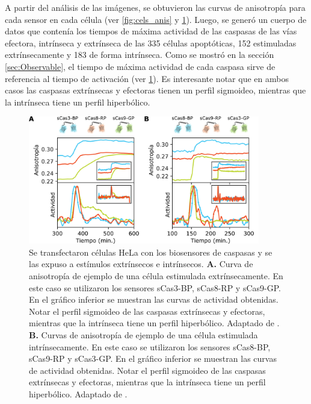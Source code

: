 A partir del análisis de las imágenes, se obtuvieron las curvas de anisotropía para cada sensor en cada célula (ver \cref{fig:cels_anis} y \cref{fig:curvas_experimentales}). Luego, se generó un cuerpo de datos que contenía los tiempos de máxima actividad de las caspasas de las vías efectora, intrínseca y extrínseca de las 335 células apoptóticas, 152 estimuladas extrínsecamente y 183 de forma intrínseca. Como se mostró en la sección \ref{sec:Observable}, el tiempo de máxima actividad de cada caspasa sirve de referencia al tiempo de activación (ver \cref{fig:curvas_experimentales}). Es interesante notar que en ambos casos las caspasas extrínsecas y efectoras tienen un perfil sigmoideo, mientras que la intrínseca tiene un perfil hiperbólico.

\begin{figure}[htb]
    \centering
    \includegraphics[width=0.9\textwidth]{img/cap_4/all_experimental_curves.png}
    \caption{\footnotesize{Se transfectaron células HeLa con los biosensores de caspasas y se las expuso a estímulos extrínsecos e intrínsecos. \textbf{A.} Curva de anisotropía de ejemplo de una célula estimulada extrínsecamente. En este caso se utilizaron los sensores sCas3-BP, sCas8-RP y sCas9-GP. En el gráfico inferior se muestran las curvas de actividad obtenidas. Notar el perfil sigmoideo de las caspasas extrínsecas y efectoras, mientras que la intrínseca tiene un perfil hiperbólico. Adaptado de \cite{Corbat2018}. \textbf{B.} Curvas de anisotropía de ejemplo de una célula estimulada intrínsecamente. En este caso se utilizaron los sensores sCas8-BP, sCas9-RP y sCas3-GP. En el gráfico inferior se muestran las curvas de actividad obtenidas. Notar el perfil sigmoideo de las caspasas extrínsecas y efectoras, mientras que la intrínseca tiene un perfil hiperbólico. Adaptado de \cite{Corbat2021}.}}
    \label{fig:curvas_experimentales}
\end{figure}

